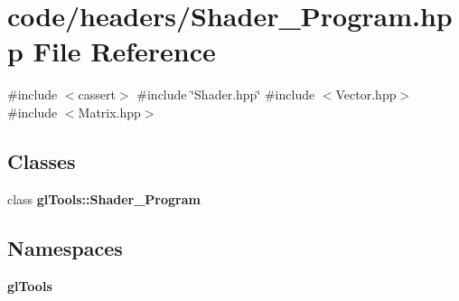 \section{code/headers/\+Shader\+\_\+\+Program.hpp File Reference}
\label{_shader___program_8hpp}
{\ttfamily \#include $<$cassert$>$}\newline
{\ttfamily \#include \char`\"{}Shader.\+hpp\char`\"{}}\newline
{\ttfamily \#include $<$Vector.\+hpp$>$}\newline
{\ttfamily \#include $<$Matrix.\+hpp$>$}\newline
\subsection*{Classes}
\begin{DoxyCompactItemize}
\item 
class \textbf{ gl\+Tools\+::\+Shader\+\_\+\+Program}
\end{DoxyCompactItemize}
\subsection*{Namespaces}
\begin{DoxyCompactItemize}
\item 
 \textbf{ gl\+Tools}
\end{DoxyCompactItemize}
